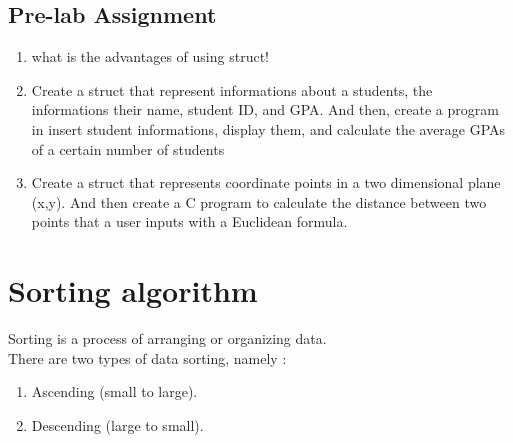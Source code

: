 \subsection{Pre-lab Assignment}
\begin{enumerate}
    \item what is the advantages of using struct!
    \item Create a struct that represent informations about a students, the informations their name, student ID, and GPA.
          And then, create a program in insert student informations, display them, and calculate the average GPAs of a
          certain number of students
    \item Create a struct that represents coordinate points in a two dimensional plane (x,y). And then create a C program to calculate
          the distance between two points that a user inputs with a Euclidean formula.
\end{enumerate}

\section{Sorting algorithm}
Sorting is a process of arranging or organizing data.\\
There are two types of data sorting, namely :
\begin{enumerate}
    \item Ascending (small to large).
    \item Descending (large to small).
\end{enumerate}

